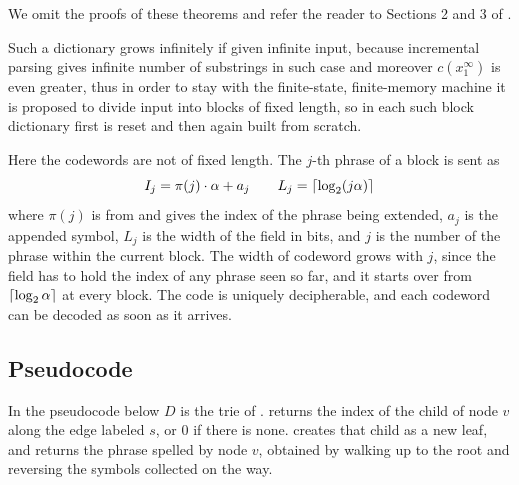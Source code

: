 We omit the proofs of these theorems and refer the reader to Sections 2 and 3 of \cite{ziv1978}.


Such a dictionary grows infinitely if given infinite input, because incremental parsing gives infinite number of substrings in such case and moreover \(c(x_1^\infty)\) is even greater, thus in order to stay with the finite-state, finite-memory machine it is proposed to divide input into blocks of fixed length, so in each such block dictionary first is reset and then again built from scratch. 

\noindent Here the codewords are not of fixed length. The \(j\)-th phrase of a block is sent as
\begin{equation}
\label{eq:lz78codeword}
  I_j = \pi (j) \cdot \alpha + a_j
  \qquad
  L_j = \left\lceil\log_2 (j \alpha)\right\rceil
\end{equation}
where \(\pi(j)\) is from  and gives the index of the phrase being extended, \(a_j\) is the appended symbol, \(L_j\) is the width of the field in bits, and \(j\) is the number of the phrase within the current block. The width of codeword grows with \(j\), since the field has to hold the index of any phrase seen so far, and it starts over from \(\left\lceil\log_2 \alpha\right\rceil\) at every block. The code is uniquely decipherable, and each codeword can be decoded as soon as it arrives.

\subsection{Pseudocode}
In the pseudocode below \(D\) is the trie of .  returns the index of the child of node \(v\) along the edge labeled \(s\), or \(0\) if there is none.  creates that child as a new leaf, and  returns the phrase spelled by node \(v\), obtained by walking up to the root and reversing the symbols collected on the way.

